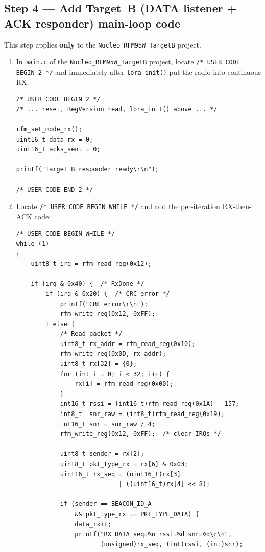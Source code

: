 \documentclass[11pt,letterpaper]{article}
\begin{document}
\newpage
\subsection{Step 4 --- Add Target~B (DATA listener + ACK responder) main-loop code}

This step applies \textbf{only} to the \texttt{Nucleo\_RFM95W\_TargetB} project.

\begin{enumerate}[leftmargin=2em]
	\item In \texttt{main.c} of the \texttt{Nucleo\_RFM95W\_TargetB} project, locate \texttt{/* USER CODE BEGIN 2 */} and immediately after \texttt{lora\_init()} put the radio into continuous RX:
\begin{verbatim}
/* USER CODE BEGIN 2 */
/* ... reset, RegVersion read, lora_init() above ... */

rfm_set_mode_rx();
uint16_t data_rx = 0;
uint16_t acks_sent = 0;

printf("Target B responder ready\r\n");

/* USER CODE END 2 */
\end{verbatim}

	\item Locate \texttt{/* USER CODE BEGIN WHILE */} and add the per-iteration RX-then-ACK code:
\begin{verbatim}
/* USER CODE BEGIN WHILE */
while (1)
{
    uint8_t irq = rfm_read_reg(0x12);

    if (irq & 0x40) {  /* RxDone */
        if (irq & 0x20) {  /* CRC error */
            printf("CRC error\r\n");
            rfm_write_reg(0x12, 0xFF);
        } else {
            /* Read packet */
            uint8_t rx_addr = rfm_read_reg(0x10);
            rfm_write_reg(0x0D, rx_addr);
            uint8_t rx[32] = {0};
            for (int i = 0; i < 32; i++) {
                rx[i] = rfm_read_reg(0x00);
            }
            int16_t rssi = (int16_t)rfm_read_reg(0x1A) - 157;
            int8_t  snr_raw = (int8_t)rfm_read_reg(0x19);
            int16_t snr = snr_raw / 4;
            rfm_write_reg(0x12, 0xFF);  /* clear IRQs */

            uint8_t sender = rx[2];
            uint8_t pkt_type_rx = rx[6] & 0x03;
            uint16_t rx_seq = (uint16_t)rx[3]
                            | ((uint16_t)rx[4] << 8);

            if (sender == BEACON_ID_A
                && pkt_type_rx == PKT_TYPE_DATA) {
                data_rx++;
                printf("RX DATA seq=%u rssi=%d snr=%d\r\n",
                       (unsigned)rx_seq, (int)rssi, (int)snr);


\end{verbatim}
\end{enumerate}
\end{document}
